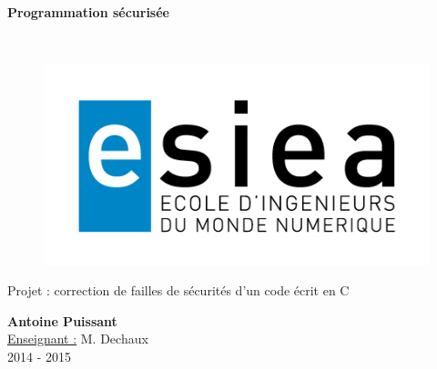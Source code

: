 \begin{titlepage}
      \begin{center}   
        \Huge
        \textbf{Programmation sécurisée}
        
        \LARGE
        ~
        
        
        \vfill
        \begin{figure}[H]
	    \centering
	    \begin{minipage}{0.9\textwidth}
		\centering
		\includegraphics[width=\textwidth]{./img/esiea.jpeg}
	    \end{minipage}\hfill
	\end{figure}
        \vfill
        
        \vspace{0.5cm}
        
        Projet : correction de failles de sécurités d'un code écrit en C
        
        \vspace{2cm}
        \textbf{Antoine Puissant}\\
        \vspace{0.8cm}
        \Large
        \underline{Enseignant :} M. Dechaux\\
        \vspace{0.5cm}
        2014 - 2015%
        
    \end{center}
\end{titlepage}